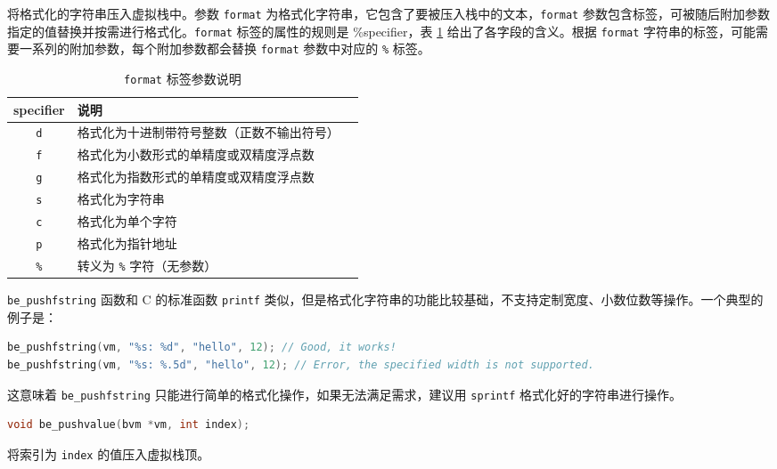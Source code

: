 将格式化的字符串压入虚拟栈中。参数 \texttt{format} 为格式化字符串，它包含了要被压入栈中的文本，\texttt{format} 参数包含标签，可被随后附加参数指定的值替换并按需进行格式化。\texttt{format} 标签的属性的规则是 \textsf{\%specifier}，表 \ref{tab::format_specifier} 给出了各字段的含义。根据 \texttt{format} 字符串的标签，可能需要一系列的附加参数，每个附加参数都会替换 \texttt{format} 参数中对应的 \texttt{\%} 标签。
\begin{table}[htb]
    \centering
    \setlength{\tabcolsep}{3mm}
    \begin{tabular}{cll} \toprule
        \textbf{\textsf{specifier}} & \textbf{说明} \\ \midrule
        \texttt{d} & 格式化为十进制带符号整数（正数不输出符号） \\
        \texttt{f} & 格式化为小数形式的单精度或双精度浮点数 \\
        \texttt{g} & 格式化为指数形式的单精度或双精度浮点数 \\
        \texttt{s} & 格式化为字符串 \\
        \texttt{c} & 格式化为单个字符 \\
        \texttt{p} & 格式化为指针地址 \\
        \texttt{\%} & 转义为 \texttt{\%} 字符（无参数） \\
        \bottomrule
    \end{tabular}
    \caption{\texttt{format} 标签参数说明}
    \label{tab::format_specifier}
\end{table}

\texttt{be\_pushfstring} 函数和 C 的标准函数 \texttt{printf} 类似，但是格式化字符串的功能比较基础，不支持定制宽度、小数位数等操作。一个典型的例子是：
\begin{lstlisting}[language=c, style=berry, numbers=none]
be_pushfstring(vm, "%s: %d", "hello", 12); // Good, it works!
be_pushfstring(vm, "%s: %.5d", "hello", 12); // Error, the specified width is not supported.
\end{lstlisting}
这意味着 \texttt{be\_pushfstring} 只能进行简单的格式化操作，如果无法满足需求，建议用 \texttt{sprintf} 格式化好的字符串进行操作。


\begin{lstlisting}[language=c, style=berry, numbers=none]
void be_pushvalue(bvm *vm, int index);
\end{lstlisting}

将索引为 \texttt{index} 的值压入虚拟栈顶。

